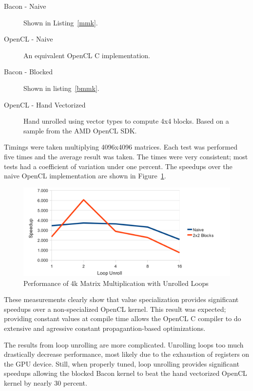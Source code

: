 \documentclass{llncs}
\begin{document}
\begin{description}
  \item[Bacon - Naive] Shown in Listing~\ref{mmk}.
  \item[OpenCL - Naive] An equivalent OpenCL C implementation.
  \item[Bacon - Blocked] Shown in listing~\ref{bmmk}.
  \item[OpenCL - Hand Vectorized] Hand unrolled using vector types to
    compute 4x4 blocks. Based on a sample from the AMD OpenCL SDK.
\end{description}

Timings were taken multiplying 4096x4096 matrices. Each test was
performed five times and the average result was taken. The times were
very consistent; most tests had a coefficient of variation under one
percent. The speedups over the naive OpenCL implementation are shown
in Figure~\ref{unroll}.

\begin{figure}[tbh]
\begin{center}
\includegraphics[clip]{unrolling}
\end{center}
\caption{Performance of 4k Matrix Multiplication with Unrolled Loops}\label{unroll}
\end{figure}

These measurements clearly show that value specialization provides
significant speedups over a non-specialized OpenCL kernel. This result
was expected; providing constant values at compile time allows the
OpenCL C compiler to do extensive and agressive constant
propagantion-based optimizations.

The results from loop unrolling are more complicated. Unrolling loops
too much drastically decrease performance, most likely due to the
exhaustion of registers on the GPU device. Still, when properly tuned,
loop unrolling provides significant speedups allowing the blocked
Bacon kernel to beat the hand vectorized OpenCL kernel by nearly 30
percent.
\end{document}
